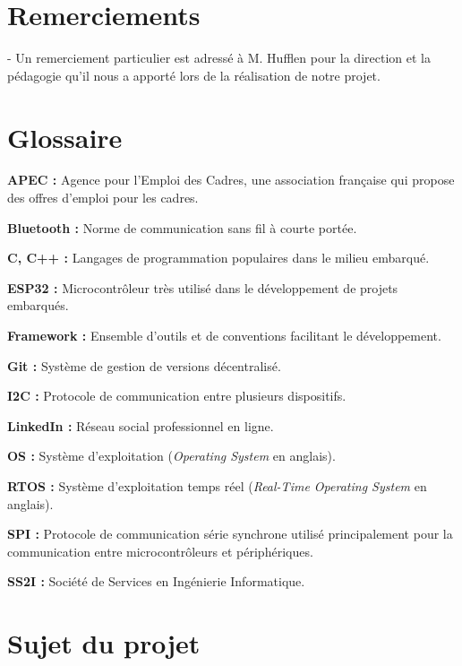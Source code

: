 \documentclass[a4paper,12pt]{report}
\begin{document}
    \newpage
    \section*{Remerciements}
    - Un remerciement particulier est adressé à M. Hufflen pour la direction et la pédagogie qu'il nous a apporté lors de la réalisation de notre projet.

    \newpage
    \tableofcontents
    \newpage


    \newpage
    \section*{Glossaire}

    \textbf{APEC :} Agence pour l'Emploi des Cadres, une association française qui propose des offres d'emploi pour les cadres.

    \textbf{Bluetooth :} Norme de communication sans fil à courte portée.

    \textbf{C, C++ :} Langages de programmation populaires dans le milieu embarqué.

    \textbf{ESP32 :} Microcontrôleur très utilisé dans le développement de projets embarqués.

    \textbf{Framework :} Ensemble d'outils et de conventions facilitant le développement.

    \textbf{Git :} Système de gestion de versions décentralisé.

    \textbf{I2C :} Protocole de communication entre plusieurs dispositifs.

    \textbf{LinkedIn :} Réseau social professionnel en ligne.

    \textbf{OS :} Système d'exploitation (\textit{Operating System} en anglais).

    \textbf{RTOS :} Système d'exploitation temps réel (\textit{Real-Time Operating System} en anglais).

    \textbf{SPI :} Protocole de communication série synchrone utilisé principalement pour la communication entre microcontrôleurs et périphériques.

    \textbf{SS2I :} Société de Services en Ingénierie Informatique.

    \newpage
    \section{Sujet du projet}\label{sec:sujet-du-projet}
    
    \newpage
\end{document}
